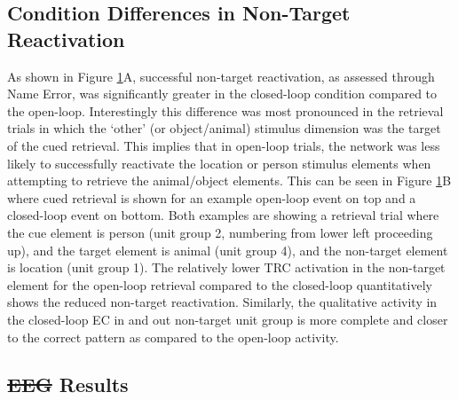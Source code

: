 \documentclass[11pt, titlepage, twoside]{article}
\providecommand{\DIFadd}[1]{{\protect\color{blue}\uwave{#1}}} %
\providecommand{\DIFdel}[1]{{\protect\color{red}\sout{#1}}}                      %
\providecommand{\DIFaddbegin}{} %
\providecommand{\DIFaddend}{} %
\providecommand{\DIFdelbegin}{} %
\providecommand{\DIFdelend}{} %
\begin{document}
\begin{figure}
{	}
     \label{fig:netNonTarg}
\end{figure}


\subsection{Condition Differences in Non-Target Reactivation}
As shown in Figure \ref{fig:netNonTarg}A, successful non-target reactivation, as assessed through Name Error, was significantly greater in the closed-loop condition compared to the open-loop.  Interestingly this difference was most pronounced in the retrieval trials in which the `other' (or object/animal) stimulus dimension was the target of the cued retrieval.  This implies that in open-loop trials, the network was less likely to successfully reactivate  the location or person stimulus elements when attempting to retrieve the animal/object elements.  This can be seen in Figure \ref{fig:netNonTarg}B where cued retrieval is shown for an example open-loop event on top and a closed-loop event on bottom.  Both examples are showing a retrieval trial where the cue element is person (unit group 2, numbering from lower left proceeding up), and the target element is animal (unit group 4), and the non-target element is location (unit group 1).  The relatively lower TRC activation in the non-target element for the open-loop retrieval compared to the closed-loop quantitatively shows the reduced non-target reactivation.  Similarly, the qualitative activity in the closed-loop EC in and out non-target unit group is more complete and closer to the correct pattern as compared to the open-loop activity.


\subsection{\DIFdelbegin \DIFdel{EEG }\DIFdelend \DIFaddbegin \DIFadd{Behavioral }\DIFaddend Results}\label{sec:eegresults}
\end{document}
